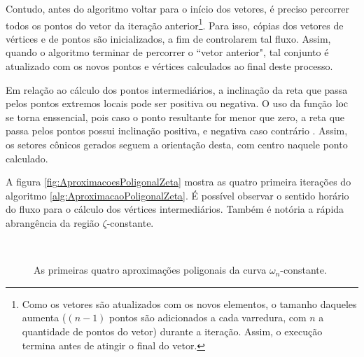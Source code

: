Contudo, antes do algoritmo voltar para o início dos vetores, é preciso percorrer todos os pontos do vetor da iteração anterior\footnote{Como os vetores são atualizados com os novos elementos, o tamanho daqueles aumenta ($(n-1)$ pontos são adicionados a cada varredura, com $n$ a quantidade de pontos do vetor) durante a iteração. Assim, o execução termina antes de atingir o final do vetor.}. Para isso, cópias dos vetores de vértices e de pontos são inicializados, a fim de controlarem tal fluxo. Assim, quando o algoritmo terminar de percorrer o ``vetor anterior", tal conjunto é atualizado com os novos pontos e vértices calculados ao final deste processo.

Em relação ao cálculo dos pontos intermediários, a inclinação da reta que passa pelos pontos extremos locais pode ser positiva ou negativa. O uso da função $\operatorname{loc}$ se torna enssencial, pois caso o ponto resultante for menor que zero, a reta que passa pelos pontos possui inclinação positiva, e negativa caso contrário \cite{WISNIEWSKI2019}. Assim, os setores cônicos gerados seguem a orientação desta, com centro naquele ponto calculado.

A figura \ref{fig:AproximacoesPoligonalZeta} mostra as quatro primeira iterações do algoritmo \ref{alg:AproximacaoPoligonalZeta}. É possível observar o sentido horário do fluxo para o cálculo dos vértices intermediários. Também é notória a rápida abrangência da região $\zeta$-constante.

\begin{figure}[!hb]
  \centering
  \begin{subfigure}[t]{0.4\columnwidth}
      
      \caption{}
      \label{subfig:AproximacaoPoligonalWn1}
  \end{subfigure}
  \begin{subfigure}[t]{0.4\columnwidth}
      
      \caption{}
      \label{subfig:AproximacaoPoligonalWn2}
  \end{subfigure}
  \\
  \begin{subfigure}[t]{0.4\columnwidth}
    
    \caption{}
    \label{subfig:AproximacaoPoligonalWn3}
  \end{subfigure}
  \begin{subfigure}[t]{0.4\columnwidth}
    
    \caption{}
    \label{subfig:AproximacaoPoligonalWn4}
  \end{subfigure}
  \caption{As primeiras quatro aproximações poligonais da curva $\omega_n$-constante.}
  \label{fig:AproximacoesPoligonalWn}
\end{figure}

